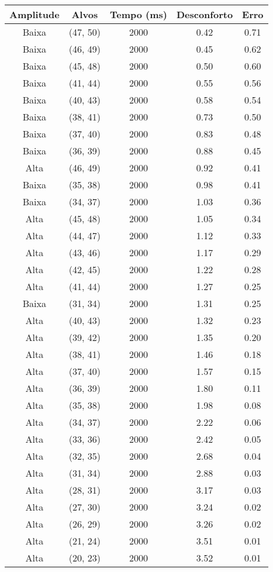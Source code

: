 \begin{tabular}{c c c c c}
\hline
Amplitude & Alvos & Tempo (ms) & Desconforto & Erro \\
\hline
Baixa & (47, 50) &  2000 & 0.42 & 0.71 \\
Baixa & (46, 49) &  2000 & 0.45 & 0.62 \\
Baixa & (45, 48) &  2000 & 0.50 & 0.60 \\
Baixa & (41, 44) &  2000 & 0.55 & 0.56 \\
Baixa & (40, 43) &  2000 & 0.58 & 0.54 \\
Baixa & (38, 41) &  2000 & 0.73 & 0.50 \\
Baixa & (37, 40) &  2000 & 0.83 & 0.48 \\
Baixa & (36, 39) &  2000 & 0.88 & 0.45 \\
Alta & (46, 49) &  2000 & 0.92 & 0.41 \\
Baixa & (35, 38) &  2000 & 0.98 & 0.41 \\
Baixa & (34, 37) &  2000 & 1.03 & 0.36 \\
Alta & (45, 48) &  2000 & 1.05 & 0.34 \\
Alta & (44, 47) &  2000 & 1.12 & 0.33 \\
Alta & (43, 46) &  2000 & 1.17 & 0.29 \\
Alta & (42, 45) &  2000 & 1.22 & 0.28 \\
Alta & (41, 44) &  2000 & 1.27 & 0.25 \\
Baixa & (31, 34) &  2000 & 1.31 & 0.25 \\
Alta & (40, 43) &  2000 & 1.32 & 0.23 \\
Alta & (39, 42) &  2000 & 1.35 & 0.20 \\
Alta & (38, 41) &  2000 & 1.46 & 0.18 \\
Alta & (37, 40) &  2000 & 1.57 & 0.15 \\
Alta & (36, 39) &  2000 & 1.80 & 0.11 \\
Alta & (35, 38) &  2000 & 1.98 & 0.08 \\
Alta & (34, 37) &  2000 & 2.22 & 0.06 \\
Alta & (33, 36) &  2000 & 2.42 & 0.05 \\
Alta & (32, 35) &  2000 & 2.68 & 0.04 \\
Alta & (31, 34) &  2000 & 2.88 & 0.03 \\
Alta & (28, 31) &  2000 & 3.17 & 0.03 \\
Alta & (27, 30) &  2000 & 3.24 & 0.02 \\
Alta & (26, 29) &  2000 & 3.26 & 0.02 \\
Alta & (21, 24) &  2000 & 3.51 & 0.01 \\
Alta & (20, 23) &  2000 & 3.52 & 0.01 \\
\hline
\end{tabular}
